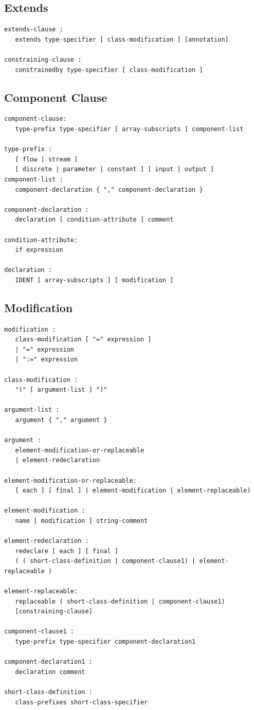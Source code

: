 \documentclass[10pt,a4paper]{report}
\def\doublelabel#1{\label{#1}\hypertarget{#1}{}}
\begin{document}
\subsection{Extends}\doublelabel{extends}
\begin{lstlisting}[language=grammar]
extends-clause :
   extends type-specifier [ class-modification ] [annotation]
   
constraining-clause :
   constrainedby type-specifier [ class-modification ]
\end{lstlisting}

\subsection{Component Clause}\doublelabel{component-clause}
\begin{lstlisting}[language=grammar]
component-clause:
   type-prefix type-specifier [ array-subscripts ] component-list
   
type-prefix :
   [ flow | stream ]
   [ discrete | parameter | constant ] [ input | output ]
component-list :
   component-declaration { "," component-declaration }

component-declaration :
   declaration [ condition-attribute ] comment

condition-attribute:
   if expression

declaration :
   IDENT [ array-subscripts ] [ modification ]
\end{lstlisting}

\subsection{Modification}\doublelabel{modification}
\begin{lstlisting}[language=grammar]
modification :
   class-modification [ "=" expression ]
   | "=" expression
   | ":=" expression
   
class-modification :
   "(" [ argument-list ] ")"
   
argument-list :
   argument { "," argument }
   
argument :
   element-modification-or-replaceable
   | element-redeclaration
   
element-modification-or-replaceable:
   [ each ] [ final ] ( element-modification | element-replaceable)
   
element-modification :
   name [ modification ] string-comment

element-redeclaration :
   redeclare [ each ] [ final ]
   ( ( short-class-definition | component-clause1) | element-replaceable )

element-replaceable:
   replaceable ( short-class-definition | component-clause1)
   [constraining-clause]
   
component-clause1 :
   type-prefix type-specifier component-declaration1
   
component-declaration1 :
   declaration comment

short-class-definition :
   class-prefixes short-class-specifier
\end{lstlisting}
\end{document}

